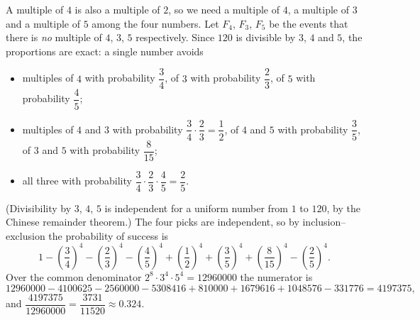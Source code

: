 A multiple of $4$ is also a multiple of $2$, so we need a multiple of $4$, a multiple of $3$ and a multiple of $5$ among the four numbers. Let $F_4$, $F_3$, $F_5$ be the events that there is \emph{no} multiple of $4$, $3$, $5$ respectively. Since $120$ is divisible by $3$, $4$ and $5$, the proportions are exact: a single number avoids
\begin{itemize}
\item multiples of $4$ with probability $\dfrac{3}{4}$, of $3$ with probability $\dfrac{2}{3}$, of $5$ with probability $\dfrac{4}{5}$;
\item multiples of $4$ and $3$ with probability $\dfrac{3}{4}\cdot\dfrac{2}{3}=\dfrac{1}{2}$, of $4$ and $5$ with probability $\dfrac{3}{5}$, of $3$ and $5$ with probability $\dfrac{8}{15}$;
\item all three with probability $\dfrac{3}{4}\cdot\dfrac{2}{3}\cdot\dfrac{4}{5}=\dfrac{2}{5}$.
\end{itemize}
(Divisibility by $3$, $4$, $5$ is independent for a uniform number from $1$ to $120$, by the Chinese remainder theorem.) The four picks are independent, so by inclusion--exclusion the probability of success is
\[
1-\left(\dfrac{3}{4}\right)^4-\left(\dfrac{2}{3}\right)^4-\left(\dfrac{4}{5}\right)^4+\left(\dfrac{1}{2}\right)^4+\left(\dfrac{3}{5}\right)^4+\left(\dfrac{8}{15}\right)^4-\left(\dfrac{2}{5}\right)^4 .
\]
Over the common denominator $2^8\cdot3^4\cdot5^4=12960000$ the numerator is
\[
12960000-4100625-2560000-5308416+810000+1679616+1048576-331776=4197375,
\]
and $\dfrac{4197375}{12960000}=\boxed{\dfrac{3731}{11520}}\approx0.324$.
